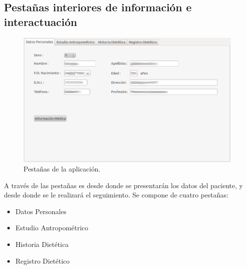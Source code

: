 \subsection{Pestañas interiores de información e interactuación}
\begin{figure}[H]
  \label{pestanas}
  \begin{center}
    \includegraphics[scale=0.5]{../../Image/pestanas.png}
  \end{center}
  \caption{Pestañas de la aplicación.}
\end{figure}

A través de las pestañas es desde donde se presentarán los datos del paciente, y desde donde se le realizará el seguimiento.
Se compone de cuatro pestañas:
\begin{itemize}
\item Datos Personales
\item Estudio Antropométrico
\item Historia Dietética
\item Registro Dietético
\end{itemize}

